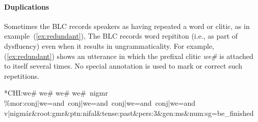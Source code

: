 \paragraph{Duplications}
Sometimes the BLC records speakers as having repeated a word or clitic, as in example~(\ref{ex:redundant}),
The BLC records word repititon (i.e., as part of dysfluency) even when it results in ungrammaticality.
For example, (\ref{ex:redundant}) shows an utterance in which the prefixal clitic \textit{we\#} is 
attached to itself several times. No special annotation is used to mark or correct such repetitions. 
\begin{exe} 
\ex \label{ex:redundant} \textsf{*CHI:\quad we\# we\# we\# we\#\, nigmr } \\
   \textsf{\%mor:\quad conj|we=and\, conj|we=and\, conj|we=and\, conj|we=and} \\
   \textsf{v|nigm\'ar\&root:gmr\&ptn:nifal\&tense:past\&pers:3\&gen:ms\&num:sg=be\_finished }
\end{exe}

 
